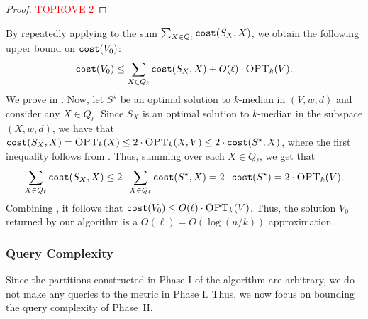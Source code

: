 \documentclass[11pt]{article}
\newcommand{\1}{\mathmybb{1}}
\newcommand{\OPT}{\textsc{OPT}}
\newcommand{\cost}{\textnormal{\texttt{cost}}}
\begin{document}
\begin{proof}\textcolor{red}{TOPROVE 2}\end{proof}


By repeatedly applying  to the sum $\sum_{X\in Q_i}\cost(S_X, X)$, we obtain the following upper bound on $\cost(V_0)$:
\begin{equation}\label{eq:myeqq}
    \cost(V_0) \leq \sum_{X \in Q_\ell} \cost(S_{X}, X) +  O(\ell) \cdot \OPT_k(V).
\end{equation}
We prove  in .
Now, let $S^\star$ be an optimal solution to $k$-median in $(V,w,d)$ and consider any $X \in Q_\ell$. Since $S_X$ is an optimal solution to $k$-median in the subspace $(X, w, d)$, we have that $\cost(S_X, X) = \OPT_k(X) \leq 2 \cdot \OPT_k(X, V) \leq 2 \cdot \cost(S^\star, X)$, where the first inequality follows from . Thus, summing over each $X \in Q_\ell$, we get that
\begin{equation}\label{eq:myeqq2}
    \sum_{X \in Q_\ell} \cost(S_X, X) \leq 2 \cdot \sum_{X \in Q_\ell} \cost(S^\star, X) = 2 \cdot \cost(S^\star) = 2\cdot \OPT_k(V).
\end{equation}
Combining , it follows that $\cost(V_0) \leq O(\ell) \cdot \OPT_k(V)$. Thus, the solution $V_0$ returned by our algorithm is a $O(\ell) = O(\log(n/k))$ approximation.

\subsubsection*{Query Complexity}
Since the partitions constructed in Phase I of the algorithm are arbitrary, we do not make any queries to the metric in Phase I.
Thus, we now focus on bounding the query complexity of Phase~II.
\end{document}
